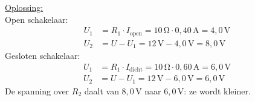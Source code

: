 \documentclass{ximera}
\begin{document}
\begin{exercise}
\begin{question}
\begin{solution}
            \underline{Oplossing:}\\
            Open schakelaar:
            \begin{align*}
                U_1 &= R_1 \cdot I_{\text{open}} = 10\,\mathrm{\Omega} \cdot 0{,}40\,\mathrm{A} = 4{,}0\,\mathrm{V} \\
                U_2 &= U - U_1 = 12\,\mathrm{V} - 4{,}0\,\mathrm{V} = 8{,}0\,\mathrm{V}
            \end{align*}
            Gesloten schakelaar:
            \begin{align*}
                U_1 &= R_1 \cdot I_{\text{dicht}} = 10\,\mathrm{\Omega} \cdot 0{,}60\,\mathrm{A} = 6{,}0\,\mathrm{V} \\
                U_2 &= U - U_1 = 12\,\mathrm{V} - 6{,}0\,\mathrm{V} = \boxed{6{,}0\,\mathrm{V}}
            \end{align*}
            De spanning over $R_2$ daalt van $8{,}0\,\mathrm{V}$ naar $6{,}0\,\mathrm{V}$: ze wordt kleiner.
        \end{solution}
    \end{question}
\end{exercise}
\end{document}
